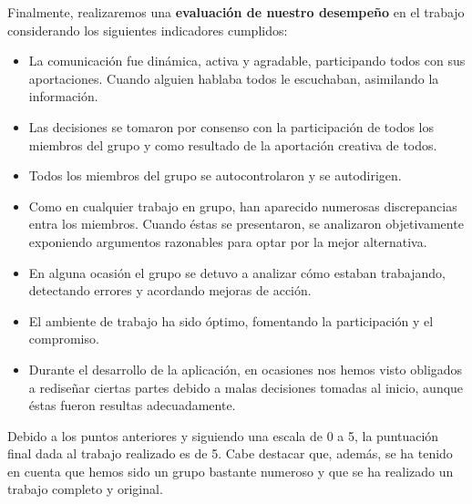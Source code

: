    Finalmente, realizaremos una \textbf{evaluación de nuestro desempeño} en el trabajo considerando los siguientes indicadores cumplidos:
   \begin{itemize}
      \item La comunicación fue dinámica, activa y agradable, participando todos con sus aportaciones. Cuando alguien hablaba todos le escuchaban,
            asimilando la información.
      \item Las decisiones se tomaron por consenso con la participación de todos los miembros del grupo y como resultado de la aportación
            creativa de todos.
      \item Todos los miembros del grupo se autocontrolaron y se autodirigen.
      \item Como en cualquier trabajo en grupo, han aparecido numerosas discrepancias entra los miembros. Cuando éstas se presentaron, se
            analizaron objetivamente exponiendo argumentos razonables para optar por la mejor alternativa.
      \item En alguna ocasión el grupo se detuvo a analizar cómo estaban trabajando, detectando errores y acordando mejoras de acción.
      \item El ambiente de trabajo ha sido óptimo, fomentando la participación y el compromiso. 
      \item Durante el desarrollo de la aplicación, en ocasiones nos hemos visto obligados a rediseñar ciertas partes debido a malas 
            decisiones tomadas al inicio, aunque éstas fueron resultas adecuadamente.
   \end{itemize}

Debido a los puntos anteriores y siguiendo una escala de 0 a 5, la puntuación final dada al trabajo realizado es de 5. Cabe destacar que, 
además, se ha tenido en cuenta que hemos sido un grupo bastante numeroso y que se ha realizado un trabajo completo y original.
